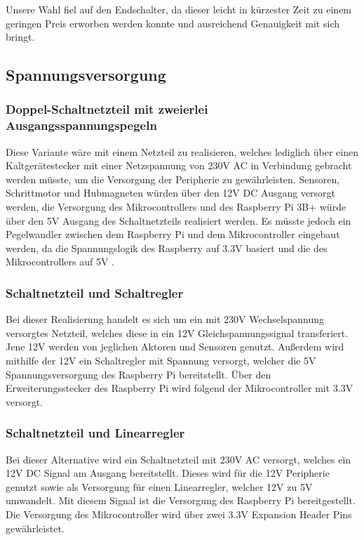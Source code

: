 Unsere Wahl fiel auf den Endschalter, da dieser leicht in kürzester Zeit zu einem geringen Preis erworben werden konnte und ausreichend Genauigkeit mit sich bringt.

\subsection{Spannungsversorgung}
\subsubsection{Doppel-Schaltnetzteil mit zweierlei Ausgangsspannungspegeln}
Diese Variante wäre mit einem Netzteil zu realisieren, welches lediglich über einen Kaltgerätestecker mit einer Netzspannung von 230V \acs{AC} in Verbindung gebracht werden müsste,
um die Versorgung der Peripherie zu gewährleisten.
Sensoren, Schrittmotor und Hubmagneten würden über den 12V \acs{DC} Ausgang versorgt werden,
die Versorgung des Mikrocontrollers und des Raspberry Pi 3B+ würde über den 5V Ausgang des Schaltnetzteils realisiert werden.
Es müsste jedoch ein Pegelwandler zwischen dem Raspberry Pi und dem Mikrocontroller eingebaut werden, da die Spannungslogik des Raspberry auf 3.3V basiert und die des Mikrocontrollers auf 5V .

\subsubsection{Schaltnetzteil und Schaltregler}
Bei dieser Realisierung handelt es sich um ein mit 230V Wechselspannung versorgtes Netzteil, welches diese in ein 12V Gleichspannungssignal transferiert.
Jene 12V werden von jeglichen Aktoren und Sensoren genutzt.
Außerdem wird mithilfe der 12V ein Schaltregler mit Spannung versorgt, welcher die 5V Spannungsversorgung des Raspberry Pi bereitstellt.
Über den Erweiterungsstecker des Raspberry Pi wird folgend der Mikrocontroller mit 3.3V versorgt.

\subsubsection{Schaltnetzteil und Linearregler}
Bei dieser Alternative wird ein Schaltnetzteil mit 230V AC versorgt, welches ein 12V DC Signal am Ausgang bereitstellt.
Dieses wird für die 12V Peripherie genutzt sowie als Versorgung für einen Linearregler, welcher 12V zu 5V umwandelt.
Mit diesem Signal ist die Versorgung des Raspberry Pi bereitgestellt.
Die Versorgung des Mikrocontroller wird über zwei 3.3V Expansion Header Pins gewährleistet.


